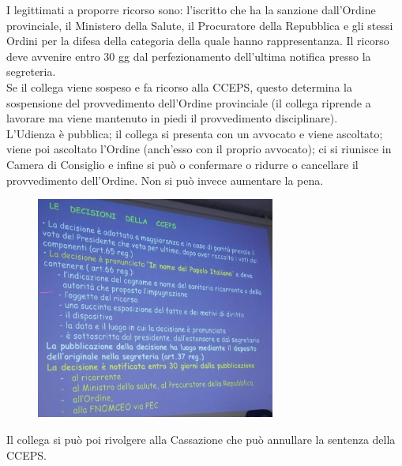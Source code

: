 I legittimati a proporre ricorso sono: l'iscritto che ha la sanzione
dall'Ordine provinciale, il Ministero della Salute, il Procuratore della
Repubblica e gli stessi Ordini per la difesa della categoria della quale
hanno rappresentanza. Il ricorso deve avvenire entro 30 gg dal
perfezionamento dell'ultima notifica presso la segreteria.
\\
Se il collega viene sospeso e fa ricorso alla CCEPS, questo determina la
sospensione del provvedimento dell'Ordine provinciale (il collega
riprende a lavorare ma viene mantenuto in piedi il provvedimento
disciplinare).
\\
L'Udienza è pubblica; il collega si presenta con un avvocato e viene
ascoltato; viene poi ascoltato l'Ordine (anch'esso con il proprio
avvocato); ci si riunisce in Camera di Consiglio e infine si può o
confermare o ridurre o cancellare il provvedimento dell'Ordine. Non si
può invece aumentare la pena.
\begin{figure}[!ht]
\centering
	\includegraphics[width=0.7\textwidth]{34/image21.jpeg}
	\end{figure}

Il collega si può poi rivolgere alla Cassazione che può annullare la
sentenza della CCEPS.


